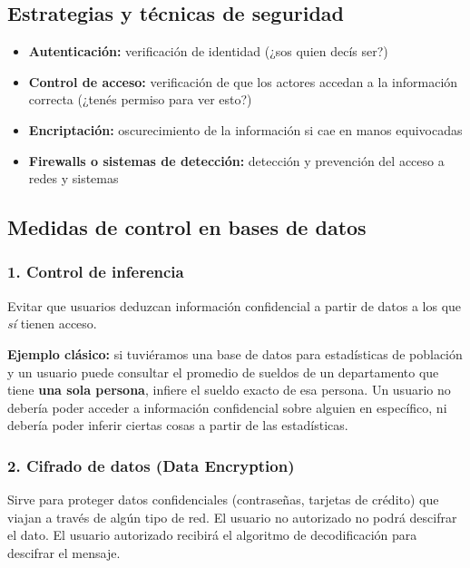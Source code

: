 \documentclass[11pt, a4paper]{article}
\begin{document}
\subsection{Estrategias y técnicas de seguridad}
\begin{itemize}
	\item \textbf{Autenticación:} verificación de identidad (¿sos quien decís ser?)
	\item \textbf{Control de acceso:} verificación de que los actores accedan a la información correcta (¿tenés permiso para ver esto?)
	\item \textbf{Encriptación:} oscurecimiento de la información si cae en manos equivocadas
	\item \textbf{Firewalls o sistemas de detección:} detección y prevención del acceso a redes y sistemas
\end{itemize}

\subsection{Medidas de control en bases de datos}

\subsubsection{1. Control de inferencia}
Evitar que usuarios deduzcan información confidencial a partir de datos a los que \textit{sí} tienen acceso.

\begin{recallbox}
	\textbf{Ejemplo clásico:} si tuviéramos una base de datos para estadísticas de población y un usuario puede consultar el promedio de sueldos de un departamento que tiene \textbf{una sola persona}, infiere el sueldo exacto de esa persona. Un usuario no debería poder acceder a información confidencial sobre alguien en específico, ni debería poder inferir ciertas cosas a partir de las estadísticas.
\end{recallbox}

\subsubsection{2. Cifrado de datos (Data Encryption)}
Sirve para proteger datos confidenciales (contraseñas, tarjetas de crédito) que viajan a través de algún tipo de red. El usuario no autorizado no podrá descifrar el dato. El usuario autorizado recibirá el algoritmo de decodificación para descifrar el mensaje.
\end{document}

